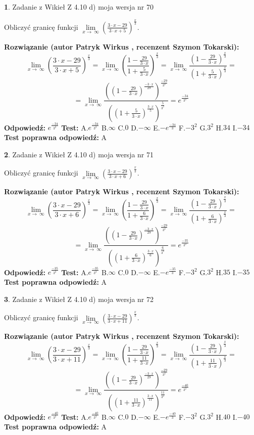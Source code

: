 \documentclass[12pt, a4paper]{article}
\theoremstyle{definition} %
\newtheorem{zad}{}
\newcommand{\zadStart}[1]{\begin{zad}#1\newline}
\newcommand{\zadStop}{\end{zad}}
\newcommand{\rozwStart}[2]{\noindent \textbf{Rozwiązanie (autor #1 , recenzent #2): }\newline}
\newcommand{\rozwStop}{\newline}
\newcommand{\odpStart}{\noindent \textbf{Odpowiedź:}\newline}
\newcommand{\odpStop}{\newline}
\newcommand{\testStart}{\noindent \textbf{Test:}\newline}
\newcommand{\testStop}{\newline}
\newcommand{\kluczStart}{\noindent \textbf{Test poprawna odpowiedź:}\newline}
\newcommand{\kluczStop}{\newline}
\begin{document}
\zadStart{Zadanie z Wikieł Z 4.10 d) moja wersja nr 70}


Obliczyć granicę funkcji  $\lim\limits_{x\to\ \infty}(\frac{3\cdot x-29}{3\cdot x+5})^{\frac{x}{3}}$.
\zadStop
\rozwStart{Patryk Wirkus}{Szymon Tokarski}
$$\lim\limits_{x\to\ \infty}(\frac{3\cdot x-29}{3\cdot x+5})^{\frac{x}{3}} = \lim\limits_{x\to\ \infty}(\frac{1-\frac{29}{3\cdot x}}{1+\frac{5}{3\cdot x}})^{\frac{x}{3}}=\lim\limits_{x\to\ \infty}\frac{(1-\frac{29}{3\cdot x})^{\frac{x}{3}}}{(1+\frac{5}{3\cdot x})^{\frac{x}{3}}}=$$
$$=\lim\limits_{x\to\ \infty}\frac{((1-\frac{29}{3\cdot x})^{\frac{-3\cdot x}{29}})^{\frac{-29}{3^{2}}}}{((1+\frac{5}{3\cdot x})^{\frac{3\cdot x}{5}})^{\frac{5}{3^{2}}}}=e^{\frac{-34}{3^{2}}}$$
\rozwStop
\odpStart
$e^{\frac{-34}{3^{2}}}$
\odpStop
\testStart
A.$e^{\frac{-34}{3^{2}}}$ B.$\infty$ C.$0$ D.$-\infty$ E.$-e^{\frac{-34}{3}}$
F.$-3^{2}$ G.$3^{2}$
H.$34$
I.$-34$
\testStop
\kluczStart
A
\kluczStop



\zadStart{Zadanie z Wikieł Z 4.10 d) moja wersja nr 71}


Obliczyć granicę funkcji  $\lim\limits_{x\to\ \infty}(\frac{3\cdot x-29}{3\cdot x+6})^{\frac{x}{3}}$.
\zadStop
\rozwStart{Patryk Wirkus}{Szymon Tokarski}
$$\lim\limits_{x\to\ \infty}(\frac{3\cdot x-29}{3\cdot x+6})^{\frac{x}{3}} = \lim\limits_{x\to\ \infty}(\frac{1-\frac{29}{3\cdot x}}{1+\frac{6}{3\cdot x}})^{\frac{x}{3}}=\lim\limits_{x\to\ \infty}\frac{(1-\frac{29}{3\cdot x})^{\frac{x}{3}}}{(1+\frac{6}{3\cdot x})^{\frac{x}{3}}}=$$
$$=\lim\limits_{x\to\ \infty}\frac{((1-\frac{29}{3\cdot x})^{\frac{-3\cdot x}{29}})^{\frac{-29}{3^{2}}}}{((1+\frac{6}{3\cdot x})^{\frac{3\cdot x}{6}})^{\frac{6}{3^{2}}}}=e^{\frac{-35}{3^{2}}}$$
\rozwStop
\odpStart
$e^{\frac{-35}{3^{2}}}$
\odpStop
\testStart
A.$e^{\frac{-35}{3^{2}}}$ B.$\infty$ C.$0$ D.$-\infty$ E.$-e^{\frac{-35}{3}}$
F.$-3^{2}$ G.$3^{2}$
H.$35$
I.$-35$
\testStop
\kluczStart
A
\kluczStop



\zadStart{Zadanie z Wikieł Z 4.10 d) moja wersja nr 72}


Obliczyć granicę funkcji  $\lim\limits_{x\to\ \infty}(\frac{3\cdot x-29}{3\cdot x+11})^{\frac{x}{3}}$.
\zadStop
\rozwStart{Patryk Wirkus}{Szymon Tokarski}
$$\lim\limits_{x\to\ \infty}(\frac{3\cdot x-29}{3\cdot x+11})^{\frac{x}{3}} = \lim\limits_{x\to\ \infty}(\frac{1-\frac{29}{3\cdot x}}{1+\frac{11}{3\cdot x}})^{\frac{x}{3}}=\lim\limits_{x\to\ \infty}\frac{(1-\frac{29}{3\cdot x})^{\frac{x}{3}}}{(1+\frac{11}{3\cdot x})^{\frac{x}{3}}}=$$
$$=\lim\limits_{x\to\ \infty}\frac{((1-\frac{29}{3\cdot x})^{\frac{-3\cdot x}{29}})^{\frac{-29}{3^{2}}}}{((1+\frac{11}{3\cdot x})^{\frac{3\cdot x}{11}})^{\frac{11}{3^{2}}}}=e^{\frac{-40}{3^{2}}}$$
\rozwStop
\odpStart
$e^{\frac{-40}{3^{2}}}$
\odpStop
\testStart
A.$e^{\frac{-40}{3^{2}}}$ B.$\infty$ C.$0$ D.$-\infty$ E.$-e^{\frac{-40}{3}}$
F.$-3^{2}$ G.$3^{2}$
H.$40$
I.$-40$
\testStop
\kluczStart
A
\kluczStop
\end{document}
